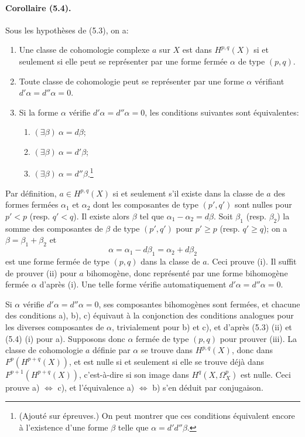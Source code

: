 \documentclass[10pt]{article}
\begin{document}
\paragraph{Corollaire (5.4).} Sous les hypothèses de (5.3), on a:
\begin{enumerate}[label=(\roman*)]
\item Une classe de cohomologie complexe $a$ sur $X$ est dans $H^{p,q}(X)$ si et seulement si elle peut se représenter par une forme fermée $\alpha$ de type $(p,q)$.
\item Toute classe de cohomologie peut se représenter par une forme $\alpha$ vérifiant $d'\alpha=d''\alpha=0$.
\item Si la forme $\alpha$ vérifie $d'\alpha=d''\alpha=0$, les conditions suivantes sont équivalentes:
\begin{enumerate}[label=\alph*)]
\item $(\exists\beta)\ \alpha=d\beta$;
\item $(\exists\beta)\ \alpha=d'\beta$;
\item $(\exists\beta)\ \alpha=d''\beta$.\footnote{(Ajouté sur épreuves.) On peut montrer que ces conditions équivalent encore à l'existence d'une forme $\beta$ telle que $\alpha=d'd''\beta$.}
\end{enumerate}
\end{enumerate}
Par définition, $a\in H^{p,q}(X)$ si et seulement s'il existe dans la classe de $a$ des formes fermées $\alpha_1$ et $\alpha_2$ dont les composantes de type $(p',q')$ sont nulles pour $p'<p$ (resp. $q'<q$). Il existe alors $\beta$ tel que $\alpha_1-\alpha_2=d\beta$. Soit $\beta_1$ (resp. $\beta_2$) la somme des composantes de $\beta$ de type $(p',q')$ pour $p'\ge p$ (resp. $q'\ge q$); on a $\beta=\beta_1+\beta_2$ et
\[
\alpha=\alpha_1-d\beta_1=\alpha_2+d\beta_2
\]
est une forme fermée de type $(p,q)$ dans la classe de $a$. Ceci prouve (i). Il suffit de prouver (ii) pour $a$ bihomogène, donc représenté par une forme bihomogène fermée $\alpha$ d'après (i). Une telle forme vérifie automatiquement $d'\alpha=d''\alpha=0$.

Si $\alpha$ vérifie $d'\alpha=d''\alpha=0$, ses composantes bihomogènes sont fermées, et chacune des conditions a), b), c) équivaut à la conjonction des conditions analogues pour les diverses composantes de $\alpha$, trivialement pour b) et c), et d'après (5.3) (ii) et (5.4) (i) pour a). Supposons donc $\alpha$ fermée de type $(p,q)$ pour prouver (iii). La classe de cohomologie $a$ définie par $\alpha$ se trouve dans $H^{p,q}(X)$, donc dans $F^p(H^{p+q}(X))$, et est nulle si et seulement si elle se trouve déjà dans $F^{p+1}(H^{p+q}(X))$, c'est-à-dire si son image dans $H^q(X,\Omega_X^p)$ est nulle. Ceci prouve a) $\Leftrightarrow$ c), et l'équivalence a) $\Leftrightarrow$ b) s'en déduit par conjugaison.
\end{document}
